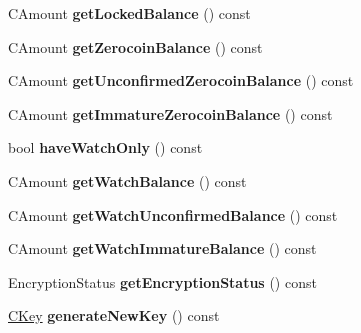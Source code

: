 \begin{DoxyCompactItemize}
\item 
\mbox{\label{class_wallet_model_a0fccd88511bce41f226c1c41604347c3}} 
C\+Amount {\bfseries get\+Locked\+Balance} () const
\item 
\mbox{\label{class_wallet_model_a9f75dd612381206f905a74de2c5be93a}} 
C\+Amount {\bfseries get\+Zerocoin\+Balance} () const
\item 
\mbox{\label{class_wallet_model_a33e712aa6733a7bc8bb1a62973ce980a}} 
C\+Amount {\bfseries get\+Unconfirmed\+Zerocoin\+Balance} () const
\item 
\mbox{\label{class_wallet_model_a223e93e413b0c79315e844bee6b8e25c}} 
C\+Amount {\bfseries get\+Immature\+Zerocoin\+Balance} () const
\item 
\mbox{\label{class_wallet_model_ab5e8e946e9ac3ddc9dc6a203e61968e2}} 
bool {\bfseries have\+Watch\+Only} () const
\item 
\mbox{\label{class_wallet_model_a6d9050286d99bccb4a28a8d88f0ca5f8}} 
C\+Amount {\bfseries get\+Watch\+Balance} () const
\item 
\mbox{\label{class_wallet_model_a691b35afd9aff056e1398fd057691ff1}} 
C\+Amount {\bfseries get\+Watch\+Unconfirmed\+Balance} () const
\item 
\mbox{\label{class_wallet_model_a9da743fbe881d4928eeafc48f50ef3d5}} 
C\+Amount {\bfseries get\+Watch\+Immature\+Balance} () const
\item 
\mbox{\label{class_wallet_model_aa89632d2019414f2ab85674cd4d01398}} 
Encryption\+Status {\bfseries get\+Encryption\+Status} () const
\item 
\mbox{\label{class_wallet_model_a4de6fd94203fb5dac370a0b1618d9bdc}} 
\mbox{\hyperlink{class_c_key}{C\+Key}} {\bfseries generate\+New\+Key} () const
\item 
\mbox{\label{class_wallet_model_a6a64730ca8256dd5ec569e26ac758719}} 

\end{DoxyCompactItemize}
